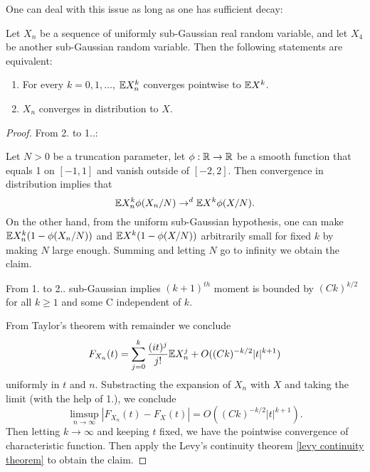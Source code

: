 One can deal with this issue as long as one has sufficient decay:

\begin{theorem}
    \label{carlman continuity theorem}
    Let $X_n$ be a sequence of uniformly sub-Gaussian real random variable, and let $X_4$ be another sub-Gaussian random variable. Then the following statements are equivalent:
    \begin{enumerate}
        \item For every $k=0,1,\dots$, $\mathbb{E} X_n^k$ converges pointwise to $\mathbb{E} X^k$.
        \item $X_n$ converges in distribution to $X$.
    \end{enumerate}
\end{theorem}

\begin{proof}
    From 2. to 1..:

    Let $N>0$ be a truncation parameter, let $\phi :\mathbb{R} \to \mathbb{R}$ be a smooth function that equals 1 on $[-1,1]$ and vanish outside of $[-2,2]$. Then convergence in distribution implies that
    \begin{equation*}
        \mathbb{E} X_n^k \phi (X_n/N) \to^d \mathbb{E} X^k\phi(X/N).
    \end{equation*}
    On the other hand, from the uniform sub-Gaussian hypothesis, one can make $\mathbb{E} X_n^k(1-\phi(X_n/N))$ and $\mathbb{E} X^k(1-\phi(X/N))$ arbitrarily small for fixed $k$ by making $N$ large enough. 
    Summing and letting $N$ go to infinity we obtain the claim.

    From 1. to 2..
    sub-Gaussian implies $(k+1)^{th}$ moment is bounded by $(Ck)^{k/2}$ for all $k\geq 1$ and some C independent of $k$. 

    From Taylor's theorem with remainder we conclude
    \begin{equation*}
        F_{X_n}(t) = \sum_{j=0}^k \frac{(it)^j}{j!}\mathbb{E} X_n^j +O((Ck)^{-k/2}|t|^{k+1})
    \end{equation*}
    uniformly in $t$ and $n$. Substracting the expansion of $X_n$ with $X$ and taking the limit (with the help of 1.), we conclude
    \begin{equation*}
        \limsup_{n\to \infty} |F_{X_n}(t)-F_X(t)| = O((Ck)^{-k/2}|t|^{k+1}).
    \end{equation*}
    Then letting $k\to \infty$ and keeping $t$ fixed, we have the pointwise convergence of characteristic function. Then apply the Levy's continuity theorem \ref{levy continuity theorem} to obtain the claim.
\end{proof}

